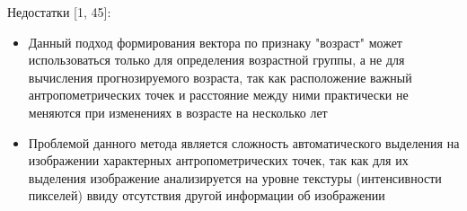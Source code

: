 \documentclass[12pt,a4paper]{article}
\begin{document}
Недостатки [1, 45]:
\begin{itemize}
    \item Данный подход формирования вектора по признаку "возраст" может использоваться только для определения возрастной группы, а не для вычисления прогнозируемого возраста, так как расположение важный антропометрических точек и расстояние между ними практически не меняются при изменениях в возрасте на несколько лет
    \item Проблемой данного метода является сложность автоматического выделения на изображении характерных антропометрических точек, так как для их выделения изображение анализируется на уровне текстуры (интенсивности пикселей) ввиду отсутствия другой информации об изображении
\end{itemize}
\end{document}
